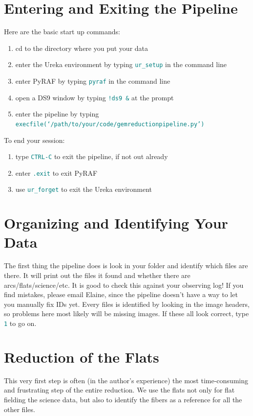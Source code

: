 \documentclass[12pt]{report}
\newcommand{\ty}[1]{\textcolor{teal}{\texttt{#1}}}
\begin{document}
\section{Entering and Exiting the Pipeline}
Here are the basic start up commands: 
\begin{enumerate}
\item cd to the directory where you put your data
\item enter the Ureka environment by typing \ty{ur\_setup} in the command line 
\item enter PyRAF by typing \ty{pyraf} in the command line
\item open a DS9 window by typing \ty{!ds9 \&} at the prompt
\item enter the pipeline by typing \ty{execfile(`/path/to/your/code/gemreductionpipeline.py')}
\end{enumerate}

\noindent To end your session:
\begin{enumerate}
\item type \ty{CTRL-C} to exit the pipeline, if not out already
\item enter \ty{.exit} to exit PyRAF
\item use \ty{ur\_forget} to exit the Ureka environment
\end{enumerate}

\section{Organizing and Identifying Your Data}

\noindent The first thing the pipeline does is look in your folder and identify which files are there. It will print out the files it found and whether there are arcs/flats/science/etc. It is good to check this against your observing log! If you find mistakes, please email Elaine, since the pipeline doesn't have a way to let you manually fix IDs yet. Every files is identified by looking in the image headers, so problems here most likely will be missing images. If these all look correct, type \ty{1} to go on.

\section{Reduction of the Flats}

This very first step is often (in the author's experience) the most time-consuming and frustrating step of the entire reduction. We use the flats not only for flat fielding the science data, but also to identify the fibers as a reference for all the other files.
\end{document}
